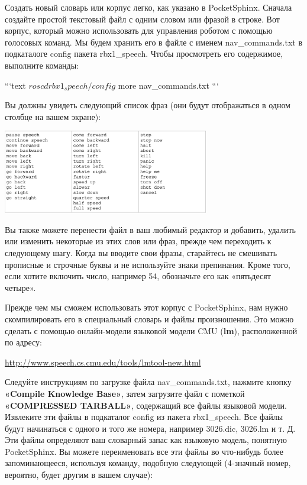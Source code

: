 

Создать новый словарь или корпус легко, как указано в PocketSphinx. Сначала создайте простой текстовый файл с одним словом или фразой в строке. Вот корпус, который можно использовать для управления роботом с помощью голосовых команд. Мы будем хранить его в файле с именем nav\_commands.txt в подкаталоге config пакета rbx1\_speech. Чтобы просмотреть его содержимое, выполните команды:

```text
$ roscd rbx1_speech/config 
$ more nav_commands.txt
```

Вы должны увидеть следующий список фраз (они будут отображаться в одном столбце на вашем экране):

\includegraphics[width=9cm]{.gitbook/assets/snimok-ekrana-2020-05-30-v-18.34.28.png}

Вы также можете перенести файл в ваш любимый редактор и добавить, удалить или изменить некоторые из этих слов или фраз, прежде чем переходить к следующему шагу. Когда вы вводите свои фразы, старайтесь не смешивать прописные и строчные буквы и не используйте знаки препинания. Кроме того, если хотите включить число, например 54, обозначьте его как «пятьдесят четыре».

Прежде чем мы сможем использовать этот корпус с PocketSphinx, нам нужно скомпилировать его в специальный словарь и файлы произношения. Это можно сделать с помощью онлайн-модели языковой модели CMU (\textbf{lm}), расположенной по адресу:

\href{http://www.speech.cs.cmu.edu/tools/lmtool-new.html}{http://www.speech.cs.cmu.edu/tools/lmtool-new.html}

Следуйте инструкциям по загрузке файла nav\_commands.txt, нажмите кнопку \textbf{«Compile Knowledge Base»}, затем загрузите файл с пометкой \textbf{«COMPRESSED TARBALL»}, содержащий все файлы языковой модели. Извлеките эти файлы в подкаталог config из пакета rbx1\_speech. Все файлы будут начинаться с одного и того же номера, например 3026.dic, 3026.lm и т. Д. Эти файлы определяют ваш словарный запас как языковую модель, понятную PocketSphinx. Вы можете переименовать все эти файлы во что-нибудь более запоминающееся, используя команду, подобную следующей (4-значный номер, вероятно, будет другим в вашем случае):

